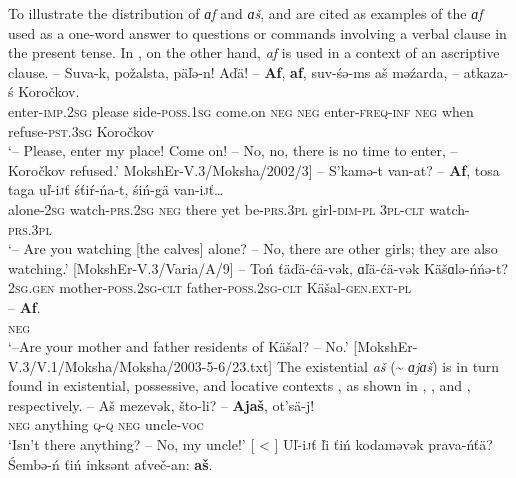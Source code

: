 \documentclass[output=paper,colorlinks,citecolor=brown,draft,draftmode]{langscibook}
\begin{document}
  To illustrate the distribution of \textit{ɑf} and \textit{ɑš},  and  are cited as examples of the \textit{ɑf} used as a one-word answer to questions or commands involving a verbal clause in the present tense. In , on the other hand, \textit{af} is used in a context of an ascriptive clause. 
\ea\label{ex:moksha-Korochkov}
\gll -- Suva-k, požalsta, päľə-n! Aďä! -- \textbf{Af}, \textbf{af}, suv-śə-ms aš məźarda, -- atkaza-ś Koročkov.\\
{} enter-\textsc{imp.2sg} please side-\textsc{poss.1sg} come.on {} \textsc{neg} \textsc{neg} enter-\textsc{freq-inf}  \textsc{neg} when {} refuse-\textsc{pst.3sg} Koročkov\\
\glt `-- Please, enter my place! Come on! -- No, no, there is no time to enter, -- Koročkov refused.' MokshEr-V.3/Moksha/2002/3]
\z 
\ea\label{ex:moksha-watching}
\gll -- S’kamə-t van-at? -- \textbf{Af}, tosa taga uľ-i\textsc{j}ť śťiŕ-ńa-t, śiń-gä van-i\textsc{j}ť\ldots\\
{} alone-\textsc{2sg} watch-\textsc{prs.2sg} {} \textsc{neg} there yet be-\textsc{prs.3pl} girl-\textsc{dim-pl} \textsc{3pl-clt} watch-\textsc{prs.3pl}\\
\glt `-- Are you watching [the calves] alone? -- No, there are other girls; they are also watching.' [MokshEr-V.3/Varia/A/9]
\z
\ea\label{ex:moksha-residents}
\gll -- Toń ťäďä-ćä-vək, ɑľä-ćä-vək Käšɑlə-ńńə-t?\\
{} \textsc{2sg.gen} mother-\textsc{poss.2sg-clt} father-\textsc{poss.2sg-clt} Käšal-\textsc{gen.ext-pl}\\
\sn
\gll -- \textbf{Af}.\\
{} \textsc{neg}\\
\glt `--Are your mother and father residents of Käšal? -- No.' [MokshEr-V.3/V.1/Moksha/Moksha/2003-5-6/23.txt]
\z
The existential \textit{aš} (\textasciitilde{} \textit{ɑjɑš}) is in turn found in existential, possessive, and locative contexts \citep[270]{Hamari2007}, as shown in , , and , respectively. 
\ea\label{ex:moksha-uncle}
\gll -- Aš mezevək, što-li? -- \textbf{Ajaš}, ot’sä-j!\\
{} \textsc{neg} anything \textsc{q-q} {} \textsc{neg} uncle-\textsc{voc}\\
\glt `Isn't there anything? -- No, my uncle!' [\citealt[270]{Hamari2007} < \citealt[888]{PaasonenRavila1947}]
\z
\ea\label{ex:moksha-right}
\gll Uľ-i\textsc{j}ť ľi ťiń kodaməvək prava-ńťä? Śembə-ń ťiń inksənt aťveč-an: \textbf{aš}.\\
\end{document}
